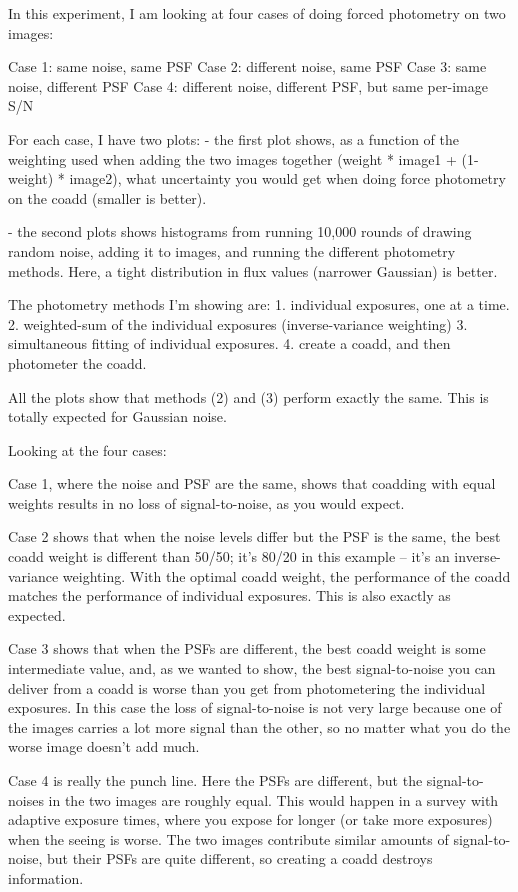 \documentclass[letter,11pt]{article}
\begin{document}
In this experiment, I am looking at four cases of doing forced photometry on two images:

Case 1: same noise, same PSF
Case 2: different noise, same PSF
Case 3: same noise, different PSF
Case 4: different noise, different PSF, but same per-image S/N

For each case, I have two plots:
- the first plot shows, as a function of the weighting used when adding the two images together (weight * image1 + (1-weight) * image2), what uncertainty you would get when doing force photometry on the coadd (smaller is better).

- the second plots shows histograms from running 10,000 rounds of drawing random noise, adding it to images, and running the different photometry methods.  Here, a tight distribution in flux values (narrower Gaussian) is better.

The photometry methods I'm showing are:
1. individual exposures, one at a time.
2. weighted-sum of the individual exposures (inverse-variance weighting)
3. simultaneous fitting of individual exposures.
4. create a coadd, and then photometer the coadd.

All the plots show that methods (2) and (3) perform exactly the same.  This is totally expected for Gaussian noise.

Looking at the four cases:

Case 1, where the noise and PSF are the same, shows that coadding with equal weights results in no loss of signal-to-noise, as you would expect.

Case 2 shows that when the noise levels differ but the PSF is the same, the best coadd weight is different than 50/50; it's 80/20 in this example -- it's an inverse-variance weighting.  With the optimal coadd weight, the performance of the coadd matches the performance of individual exposures.  This is also exactly as expected.

Case 3 shows that when the PSFs are different, the best coadd weight is some intermediate value, and, as we wanted to show, the best signal-to-noise you can deliver from a coadd is worse than you get from photometering the individual exposures.  In this case the loss of signal-to-noise is not very large because one of the images carries a lot more signal than the other, so no matter what you do the worse image doesn't add much.

Case 4 is really the punch line.  Here the PSFs are different, but the signal-to-noises in the two images are roughly equal.  This would happen in a survey with adaptive exposure times, where you expose for longer (or take more exposures) when the seeing is worse.  The two images contribute similar amounts of signal-to-noise, but their PSFs are quite different, so creating a coadd destroys information.
\end{document}
